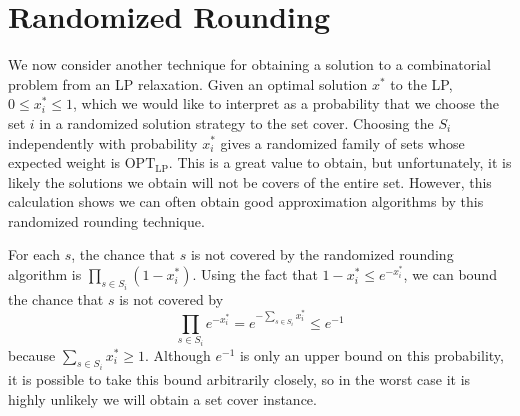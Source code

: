 \section{Randomized Rounding}

We now consider another technique for obtaining a solution to a combinatorial problem from an LP relaxation. Given an optimal solution $x^*$ to the LP, $0 \leq x_i^* \leq 1$, which we would like to interpret as a probability that we choose the set $i$ in a randomized solution strategy to the set cover. Choosing the $S_i$ independently with probability $x^*_i$ gives a randomized family of sets whose expected weight is $\text{OPT}_{\text{LP}}$. This is a great value to obtain, but unfortunately, it is likely the solutions we obtain will not be covers of the entire set. However, this calculation shows we can often obtain good approximation algorithms by this randomized rounding technique.

For each $s$, the chance that $s$ is not covered by the randomized rounding algorithm is $\prod_{s \in S_i} (1 - x^*_i)$. Using the fact that $1 - x^*_i \leq e^{-x^*_i}$, we can bound the chance that $s$ is not covered by
%
\[ \prod_{s \in S_i} e^{-x^*_i} = e^{- \sum_{s \in S_i} x^*_i} \leq e^{-1} \]
%
because $\sum_{s \in S_i} x^*_i \geq 1$. Although $e^{-1}$ is only an upper bound on this probability, it is possible to take this bound arbitrarily closely, so in the worst case it is highly unlikely we will obtain a set cover instance.

